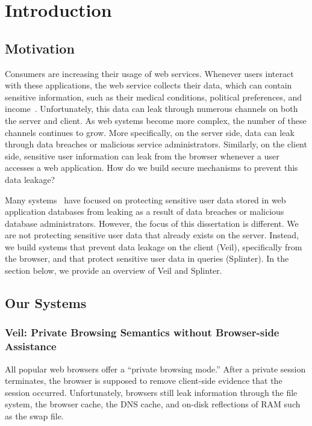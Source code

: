 \section{Introduction}
\label{chap:intro}

\subsection{Motivation}
Consumers are increasing their usage of web services. Whenever
users interact with these applications, the web service collects
their data, which can contain sensitive 
information, such as their medical conditions,
political preferences, and income~\cite{narayanan2010myths, narayanan2008robust}.
Unfortunately, this data can 
leak through numerous channels on both the server
and client. As web systems become more complex, the 
number of these channels continues to grow. More specifically,
on the server side, data can leak through data breaches
or malicious service administrators. Similarly, on the client side,
sensitive user information can leak from the browser whenever
a user accesses a web application. How do we build secure
mechanisms to prevent this data leakage?

Many systems~\cite{popa:mylar, popa:cryptdb, li:sundr, feldman:sporc} 
have focused on protecting sensitive user data stored
in web application databases 
from leaking as a result of data breaches or malicious 
database administrators. However, the focus of
this dissertation is different. We are not protecting sensitive 
user data that already exists on the server.
Instead, we build systems
that prevent data leakage on the client (Veil), specifically
from the browser, and that protect sensitive user data in queries (Splinter).
In the section below, we provide an overview of Veil and Splinter.

\subsection{Our Systems}

\subsubsection{Veil: Private Browsing Semantics without Browser-side Assistance}
All popular web browsers offer a ``private browsing
mode.'' After a private session terminates, the
browser is supposed to remove client-side
evidence that the session occurred. Unfortunately,
browsers still leak information through the file
system, the browser cache, the DNS cache, and
on-disk reflections of RAM such as the swap file.

